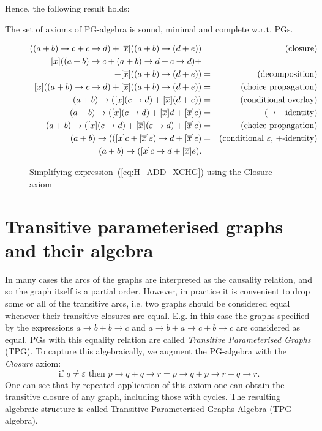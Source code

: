 Hence, the following result holds:
\begin{thm}
 The set of axioms of PG-algebra
is sound, minimal and complete w.r.t. PGs.
\end{thm}
\begin{figure}

\begin{eqnarray*}
[x]((a+b)\rightarrow c+c\rightarrow d)+[\overline{x}]((a+b)\rightarrow(d+e)) & = & (\textrm{closure)}\\
{}[x]((a+b)\rightarrow c+(a+b)\rightarrow d+c\rightarrow d)+\\+[\overline{x}]((a+b)\rightarrow(d+e)) & = & (\textrm{decomposition)}\\
{}[x]((a+b)\rightarrow c\rightarrow d)+[\overline{x}]((a+b)\rightarrow(d+e)) & = & (\textrm{choice propagation)}\\
(a+b)\rightarrow([x](c\rightarrow d)+[\overline{x}](d+e)) & = & (\textrm{conditional overlay)}\\
(a+b)\rightarrow([x](c\rightarrow d)+[\overline{x}]d+[\overline{x}]e) & = & (\rightarrow-\textrm{identity)}\\
(a+b)\rightarrow([x](c\rightarrow d)+[\overline{x}](\varepsilon\rightarrow d)+[\overline{x}]e) & = & (\textrm{choice propagation)}\\
(a+b)\rightarrow(([x]c+[\overline{x}]\varepsilon)\rightarrow d+[\overline{x}]e) & = & (\textrm{conditional \ensuremath{\varepsilon}, +-\textrm{identity)}}\\
(a+b)\rightarrow([x]c\rightarrow d+[\overline{x}]e).
\end{eqnarray*}


\caption{Simplifying expression~(\ref{eq:H_ADD_XCHG}) using the Closure axiom\label{fig:Simplifying-TPG-expressions}}
\end{figure}



\section{Transitive parameterised graphs and their algebra}

In many cases the arcs of the graphs are interpreted as the causality
relation, and so the graph itself is a partial order. However, in
practice it is convenient to drop some or all of the transitive arcs,
i.e. two graphs should be considered equal whenever their transitive
closures are equal. E.g. in this case the graphs specified by the
expressions $a\rightarrow b+b\rightarrow c$ and $a\rightarrow b+a\rightarrow c+b\rightarrow c$
are considered as equal. PGs with this equality relation are called
\emph{Transitive Parameterised Graphs} (TPG). To capture this algebraically,
we augment the PG-algebra with the \emph{Closure} axiom:
\[
\mbox{{if\ }}q\neq\varepsilon\mbox{{\ then\ }}p\!\rightarrow\! q+q\!\rightarrow\! r=p\!\rightarrow\! q+p\!\rightarrow\! r+q\!\rightarrow\! r.
\]
One can see that by repeated application of this axiom one can obtain
the transitive closure of any graph, including those with cycles.
The resulting algebraic structure is called Transitive Parameterised Graphs Algebra
(TPG-algebra).

